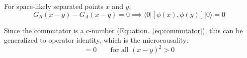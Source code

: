 \documentclass[a4paper,11pt]{article}
\begin{document}
For space-likely separated points $x$ and $y$,  
\begin{equation}
    G_R(x-y) - G_A(x-y) = 0 \implies \langle 0|[\phi(x), \phi(y)]|0\rangle = 0
\end{equation}

Since the commutator is a c-number (Equation.~\ref{eq:commutator}), this can be generalized to operator identity, which is the microcausality:
\begin{equation}
    [\phi(x), \phi(y)] = 0 \qquad \text{for all } (x-y)^2 > 0
\end{equation}
\end{document}
